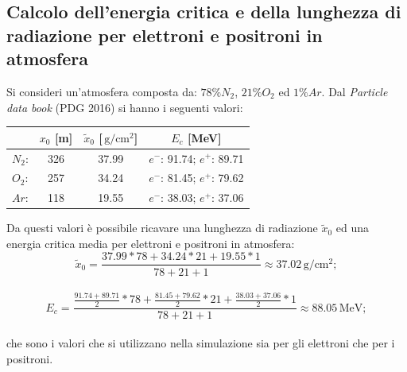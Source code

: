 \documentclass[10pt,a4paper,usenatbib]{article}
\newcommand*{\unit}[1]{\ensuremath{\mathrm{\,#1}}}                              %
\begin{document}
\subsection{Calcolo dell'energia critica e della lunghezza di radiazione per elettroni e positroni in atmosfera}
Si consideri un'atmosfera composta da: $78\% N_2$, $21\% O_2$ ed $1\% Ar$. Dal \textit{Particle data book} (PDG 2016) si hanno i seguenti valori: 
\begin{table}[h!]
\centering
\begin{tabular}{lccc}
\toprule
                      &   $x_0$ [m]   &   $\tilde{x}_0$ [$\unit{g/cm^2}$]   &   $E_c$ [MeV]                  \\                          
\midrule
$N_2$:          &   326              &   37.99                               &  $e^-$: 91.74; $e^+$: 89.71        \\
$O_2$:          &   257              &   34.24                               &  $e^-$: 81.45; $e^+$: 79.62         \\
$Ar$:             &   118              &   19.55                               &  $e^-$: 38.03; $e^+$: 37.06          \\
\bottomrule
\end{tabular}
\end{table}
Da questi valori è possibile ricavare una lunghezza di radiazione $\tilde{x}_0$ ed una energia critica media per elettroni e positroni in atmosfera: \\
\begin{equation*}
\tilde{x}_0 = \frac{37.99*78+34.24*21+19.55*1}{78+21+1} \approx 37.02\unit{g/cm^2};
\end{equation*}
\\
\begin{equation*}
E_c = \frac{\frac{91.74 + 89.71}{2}*78+\frac{81.45 + 79.62}{2}*21+\frac{38.03 + 37.06}{2}*1}{78+21+1} \approx 88.05\unit{MeV};
\end{equation*}
\\che sono i valori che si utilizzano nella simulazione sia per gli elettroni che per i positroni. 



\end{document}
